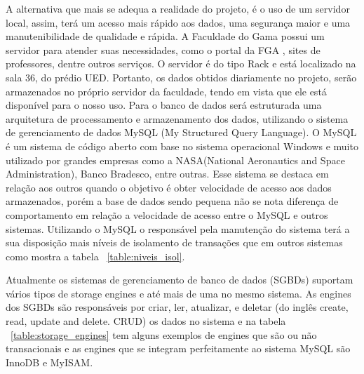 A alternativa que mais se adequa a realidade do projeto, é o uso de um servidor local, assim, terá um acesso mais rápido aos dados, uma segurança maior e uma manutenibilidade de qualidade e rápida. 
A Faculdade do Gama possui um servidor para atender suas necessidades, como o portal da FGA , sites de professores, dentre outros serviços. O servidor é do tipo Rack e está localizado na sala 36, do prédio UED. Portanto, os dados obtidos diariamente no projeto, serão armazenados no próprio servidor da faculdade, tendo em vista que ele está disponível para o nosso uso.
Para o banco de dados será estruturada uma arquitetura de processamento e armazenamento dos dados, utilizando o sistema de gerenciamento de dados MySQL (My Structured Query Language). O MySQL é um sistema de código aberto com base no sistema operacional Windows e muito utilizado por grandes empresas como a NASA(National Aeronautics and Space Administration), Banco Bradesco, entre outras. Esse sistema se destaca em relação aos outros quando o objetivo é obter velocidade de acesso aos dados armazenados, porém a base de dados sendo pequena não se nota diferença de comportamento em relação a velocidade de acesso entre o MySQL e outros sistemas. Utilizando o MySQL o responsável pela manutenção do sistema terá a sua disposição mais níveis de isolamento de transações que em outros sistemas como mostra a tabela ~\ref{table:niveis_isol}.

\begin{table}[]
\centering
\caption{Comparação Níveis de Isolamento.}
\label{table:niveis_isol}
\end{table}

Atualmente os sistemas de gerenciamento de banco de dados (SGBDs) suportam vários tipos de storage engines e até mais de uma no mesmo sistema. As engines dos SGBDs são responsáveis por criar, ler, atualizar,  e deletar (do inglês create, read, update and delete. CRUD) os dados no sistema e na tabela ~\ref{table:storage_engines} tem alguns exemplos de engines que são ou não transacionais e as engines que se integram perfeitamente ao sistema MySQL são InnoDB e MyISAM.

